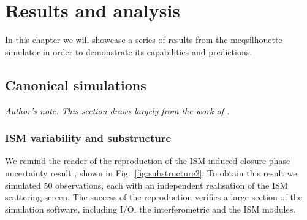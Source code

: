 \chapter{Results and analysis}
In this chapter we will showcase a series of results from the {\sc meqsilhouette} simulator in order to demonstrate its capabilities and predictions.


\section{Canonical simulations}\label{sec:can_sim}
{\it Author's note: This section draws largely from the work of \citet{Blecher_2016}.}

\subsection{ISM variability and substructure}
We remind the reader of the reproduction of the ISM-induced closure phase uncertainty result \citep{Ortiz_2016}, shown in Fig.~\ref{fig:substructure2}. To obtain this result we simulated 50 observations, each with an independent realisation of the ISM scattering screen. The success of the reproduction verifies a large section of the simulation software, including I/O, the interferometric and the ISM modules. 

